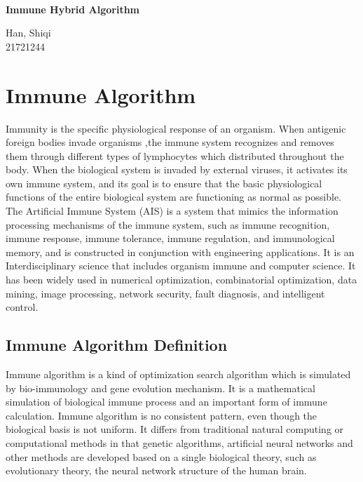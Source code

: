\documentclass[11pt,a4paper,oldfontcommands]{memoir}
\begin{document}
\thispagestyle{empty}
{
\sffamily
\centering
\Large

~\vspace{\fill}

{\Huge
\textbf{Immune Hybrid Algorithm} 
}

\vspace{2.5cm}

{\LARGE{Han, Shiqi} \\
\large{21721244}
}

\vspace{\fill}
}

\clearpage
\setcounter{page}{0}
\tableofcontents*
\thispagestyle{empty}

\chapter{Immune Algorithm}

Immunity is the specific physiological response of an organism. When antigenic foreign bodies invade organisms ,the immune system recognizes and removes them through different types of lymphocytes which distributed throughout the body. When the biological system is invaded by external viruses, it activates its own immune system, and its goal is to ensure that the basic physiological functions of the entire biological system are functioning as normal as possible.
The Artificial Immune System (AIS) is a system that mimics the information processing mechanisms of the immune system, such as immune recognition, immune response, immune tolerance, immune regulation, and immunological memory, and is constructed in conjunction with engineering applications. It is an Interdisciplinary science that includes organism immune and computer science. It has been widely used in numerical optimization, combinatorial optimization, data mining, image processing, network security, fault diagnosis, and intelligent control.

\section{Immune Algorithm Definition}
Immune algorithm is a kind of optimization search algorithm which is simulated by bio-immunology and gene evolution mechanism. It is a mathematical simulation of biological immune process and an important form of immune calculation. Immune algorithm is no consistent pattern, even though the biological basis is not uniform. It differs from traditional natural computing or computational methods in that genetic algorithms, artificial neural networks and other methods are developed based on a single biological theory, such as evolutionary theory, the neural network structure of the human brain.
\end{document}
